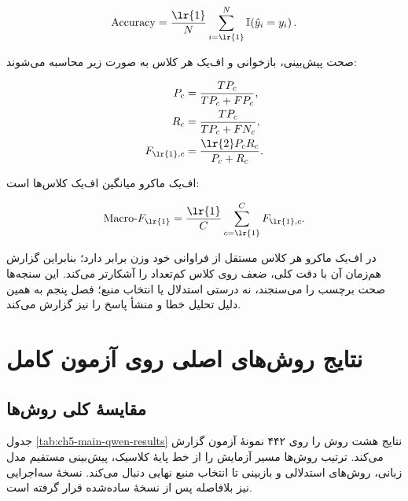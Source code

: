 \begin{equation}
    \mathrm{Accuracy}
    = \frac{\text{\lr{1}}}{N}
    \sum_{i=\text{\lr{1}}}^{N} \mathbb{I}\!\left(\hat{y}_i=y_i\right).
    \label{eq:accuracy}
\end{equation}

صحت پیش‌بینی، بازخوانی و اف‌یک هر کلاس به صورت زیر محاسبه می‌شوند:

\begin{align}
    P_c &= \frac{TP_c}{TP_c+FP_c}, \label{eq:precision}\\
    R_c &= \frac{TP_c}{TP_c+FN_c}, \label{eq:recall}\\
    F_{\text{\lr{1}},c} &= \frac{\text{\lr{2}}P_cR_c}{P_c+R_c}. \label{eq:f1-class}
\end{align}

اف‌یک ماکرو میانگین اف‌یک کلاس‌ها است:

\begin{equation}
    \mathrm{Macro}\text{-}F_{\text{\lr{1}}}
    =\frac{\text{\lr{1}}}{C}\sum_{c=\text{\lr{1}}}^{C}F_{\text{\lr{1}},c}.
    \label{eq:macro-f1}
\end{equation}

در اف‌یک ماکرو هر کلاس مستقل از فراوانی خود وزن برابر دارد؛ بنابراین گزارش هم‌زمان آن با دقت کلی، ضعف روی کلاس کم‌تعداد را آشکارتر می‌کند. این سنجه‌ها صحت برچسب را می‌سنجند، نه درستی استدلال یا انتخاب منبع؛ فصل پنجم به همین دلیل تحلیل خطا و منشأ پاسخ را نیز گزارش می‌کند.

\section{نتایج روش‌های اصلی روی آزمون کامل}

\subsection{مقایسۀ کلی روش‌ها}

جدول \ref{tab:ch5-main-qwen-results} نتایج هشت روش را روی ۴۴۲ نمونۀ آزمون گزارش می‌کند. ترتیب روش‌ها مسیر آزمایش را از خط پایۀ کلاسیک، پیش‌بینی مستقیم مدل زبانی، روش‌های استدلالی و بازبینی تا انتخاب منبع نهایی دنبال می‌کند. نسخۀ  سه‌اجرایی نیز بلافاصله پس از نسخۀ ساده‌شده قرار گرفته است.

